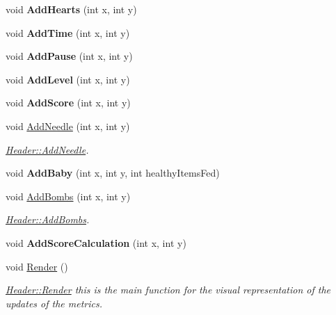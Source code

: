\begin{DoxyCompactItemize}
\item 
\hypertarget{classHeader_a0fac13736d7e8e507c329610843cb69c}{void {\bfseries Add\-Hearts} (int x, int y)}\label{classHeader_a0fac13736d7e8e507c329610843cb69c}

\item 
\hypertarget{classHeader_ae1f122fb7729e9930ab8476f5515a553}{void {\bfseries Add\-Time} (int x, int y)}\label{classHeader_ae1f122fb7729e9930ab8476f5515a553}

\item 
\hypertarget{classHeader_af8bb49d54827ccc10848225f1fbf4f4b}{void {\bfseries Add\-Pause} (int x, int y)}\label{classHeader_af8bb49d54827ccc10848225f1fbf4f4b}

\item 
\hypertarget{classHeader_a689b3d9320ab2541a21c402a5faf98d1}{void {\bfseries Add\-Level} (int x, int y)}\label{classHeader_a689b3d9320ab2541a21c402a5faf98d1}

\item 
\hypertarget{classHeader_ad70bb097047f2e6929f0b877e3c8313d}{void {\bfseries Add\-Score} (int x, int y)}\label{classHeader_ad70bb097047f2e6929f0b877e3c8313d}

\item 
void \hyperlink{classHeader_aa035a6e33a0a098e31f30847af6cfab5}{Add\-Needle} (int x, int y)
\begin{DoxyCompactList}\small\item\em \hyperlink{classHeader_aa035a6e33a0a098e31f30847af6cfab5}{Header\-::\-Add\-Needle}. \end{DoxyCompactList}\item 
\hypertarget{classHeader_a23c18703ab45ddb0433f04a4a458e70c}{void {\bfseries Add\-Baby} (int x, int y, int healthy\-Items\-Fed)}\label{classHeader_a23c18703ab45ddb0433f04a4a458e70c}

\item 
void \hyperlink{classHeader_a21be452fa582357209fba40253628e67}{Add\-Bombs} (int x, int y)
\begin{DoxyCompactList}\small\item\em \hyperlink{classHeader_a21be452fa582357209fba40253628e67}{Header\-::\-Add\-Bombs}. \end{DoxyCompactList}\item 
\hypertarget{classHeader_a2f60a58e7438f57e33780e1047e4b9ba}{void {\bfseries Add\-Score\-Calculation} (int x, int y)}\label{classHeader_a2f60a58e7438f57e33780e1047e4b9ba}

\item 
void \hyperlink{classHeader_ae84e230bd170c5019cf75a6aae297401}{Render} ()
\begin{DoxyCompactList}\small\item\em \hyperlink{classHeader_ae84e230bd170c5019cf75a6aae297401}{Header\-::\-Render} this is the main function for the visual representation of the updates of the metrics. \end{DoxyCompactList}\end{DoxyCompactItemize}

